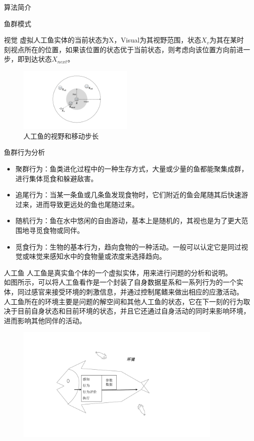 \documentclass[a4paper, 11pt]{article}
\begin{document}
\begin{section}
{算法简介}
	\begin{subsection}
	{鱼群模式}
		\begin{subsubsection}
		{视觉}	虚拟人工鱼实体的当前状态为X，Visual为其视野范围，状态$X_v$为其在某时刻视点所在的位置，如果该位置的状态优于当前状态，则考虑向该位置方向前进一步，即到达状态$X_{next}。$
		\begin{figure}[htbp]
			\centering
			\includegraphics[width=0.5\textwidth]{../pic/fish1.pdf}
			\caption{人工鱼的视野和移动步长}
		\end{figure}
		\end{subsubsection}
		\begin{subsubsection}
		{鱼群行为分析}
		\begin{itemize}
			\item{聚群行为：鱼类进化过程中的一种生存方式，大量或少量的鱼都能聚集成群，进行集体觅食和躲避敌害。}
			\item{追尾行为：当某一条鱼或几条鱼发现食物时，它们附近的鱼会尾随其后快速游过来，进而导致更远处的鱼也尾随过来。}
			\item{随机行为：鱼在水中悠闲的自由游动，基本上是随机的，其视也是为了更大范围地寻觅食物或同伴。}
			\item{觅食行为：生物的基本行为，趋向食物的一种活动。一般可以认定它是同过视觉或味觉来感知水中的食物量或浓度来选择趋向。}
		\end{itemize}
		\end{subsubsection}
		\begin{subsubsection}
		{人工鱼}		人工鱼是真实鱼个体的一个虚拟实体，用来进行问题的分析和说明。\\如图所示，可以将人工鱼看作是一个封装了自身数据星系和一系列行为的一个实体，同过感官来接受环境的刺激信息，并通过控制尾鳍来做出相应的应激活动。\\人工鱼所在的环境主要是问题的解空间和其他人工鱼的状态，它在下一刻的行为取决于目前自身状态和目前环境的状态，并且它还通过自身活动的同时来影响环境，进而影响其他同伴的活动。
		\begin{figure}[htbp]
			\centering
			\includegraphics[width=0.9\textwidth]{../pic/fish2.pdf}

\end{figure}
\end{subsubsection}
\end{subsection}
\end{section}
\end{document}
